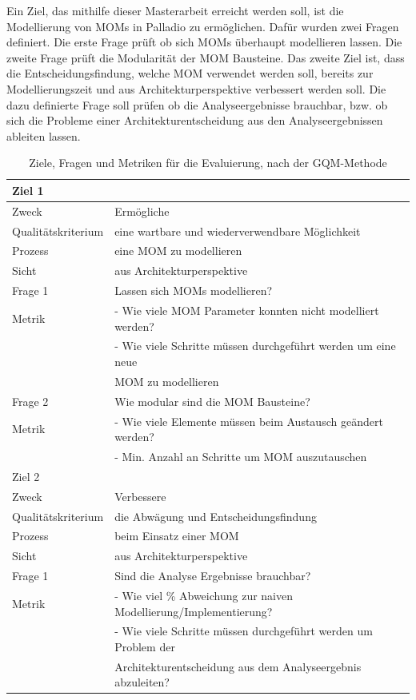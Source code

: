 Ein Ziel, das mithilfe dieser Masterarbeit erreicht werden soll, ist die Modellierung von MOMs in Palladio zu ermöglichen. Dafür wurden zwei Fragen definiert. Die erste Frage prüft ob sich MOMs überhaupt modellieren lassen. Die zweite Frage prüft die Modularität der MOM Bausteine. Das zweite Ziel ist, dass die Entscheidungsfindung, welche MOM verwendet werden soll, bereits zur Modellierungszeit und aus Architekturperspektive verbessert werden soll. Die dazu definierte Frage soll prüfen ob die Analyseergebnisse brauchbar, bzw. ob sich die Probleme einer Architekturentscheidung aus den Analyseergebnissen ableiten lassen. 
\begin{table}
  \begin{tabular}{|l|l|}
    \hline
    \multicolumn{2}{|l|}{Ziel 1} \\
    \hline
    Zweck & Ermögliche \\
    Qualitätskriterium & eine wartbare und wiederverwendbare Möglichkeit  \\ 
    Prozess & eine MOM zu modellieren \\
    Sicht & aus Architekturperspektive \\
   
    \hline \hline
    Frage 1 & Lassen sich MOMs modellieren? \\
    \hline
    Metrik & - Wie viele MOM Parameter konnten nicht modelliert werden? \\
    & - Wie viele Schritte müssen durchgeführt werden um eine neue \\
    & MOM zu modellieren\\
    \hline\hline
    Frage 2 & Wie modular sind die MOM Bausteine? \\
    \hline
    Metrik & - Wie viele Elemente müssen beim Austausch geändert werden? \\
    & - Min. Anzahl an Schritte um MOM auszutauschen \\
    \hline\hline
    \multicolumn{2}{|l|}{Ziel 2} \\
    \hline
    Zweck & Verbessere \\
    Qualitätskriterium & die Abwägung und Entscheidungsfindung  \\ 
    Prozess & beim Einsatz einer MOM \\
    Sicht & aus Architekturperspektive \\
    \hline \hline
    Frage 1 & Sind die Analyse Ergebnisse brauchbar? \\
    \hline
    Metrik & - Wie viel \% Abweichung zur naiven Modellierung/Implementierung? \\
    & - Wie viele Schritte müssen durchgeführt werden um Problem der \\
    & Architekturentscheidung aus dem Analyseergebnis abzuleiten? \\
    \hline
  \end{tabular}
	\caption{\label{tab:gqm} Ziele, Fragen und Metriken für die Evaluierung, nach der GQM-Methode}
\end{table}


